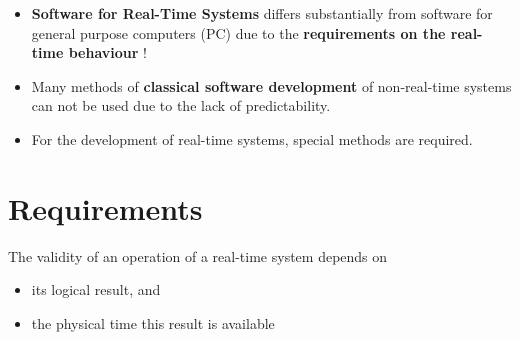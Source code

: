 \begin{itemize}
\item \textbf{ Software for Real-Time Systems} differs substantially from software for general purpose computers (PC) due to the \textbf{requirements on the real-time behaviour} !

\item Many methods of \textbf{classical software development} of non-real-time systems can not be used due to the lack of predictability.

\item For the development of real-time systems, special methods are required.
\end{itemize}

\section{Requirements}

The validity of an operation of a real-time system depends on

\begin{itemize}
	\item  its logical result, and
	\item  the physical time this result is available
\end{itemize}

\begin{figure}[h]
    \centering
    \qquad
    \qquad
    \label{fig:Fig 3}%
\end{figure}

